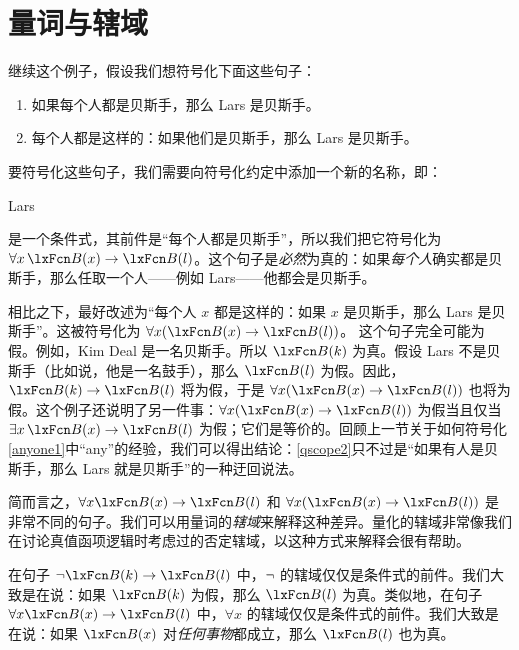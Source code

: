 \section{量词与辖域}
继续这个例子，假设我们想符号化下面这些句子：


\begin{enumerate}
		\item\label{qscope1} 如果每个人都是贝斯手，那么 Lars 是贝斯手。
		\item\label{qscope2} 每个人都是这样的：如果他们是贝斯手，那么 Lars 是贝斯手。
	\end{enumerate}


要符号化这些句子，我们需要向符号化约定中添加一个新的名称，即：


\begin{ekey}
		\item[l] Lars
	\end{ekey}


是一个条件式，其前件是“每个人都是贝斯手”，所以我们把它符号化为 $\forall x\, \atom{B}{x} \eif \atom{B}{l}$。这个句子是\emph{必然}为真的：如果\emph{每个人}确实都是贝斯手，那么任取一个人——例如 Lars——他都会是贝斯手。

相比之下，最好改述为“每个人 $x$ 都是这样的：如果 $x$ 是贝斯手，那么 Lars 是贝斯手”。这被符号化为 $\forall x (\atom{B}{x} \eif \atom{B}{l})$。
这个句子完全可能为假。例如，Kim Deal 是一名贝斯手。所以 $\atom{B}{k}$ 为真。假设 Lars 不是贝斯手（比如说，他是一名鼓手），那么 $\atom{B}{l}$ 为假。因此，$\atom{B}{k} \eif \atom{B}{l}$ 将为假，于是 $\forall x
(\atom{B}{x} \eif \atom{B}{l})$ 也将为假。这个例子还说明了另一件事：$\forall x (\atom{B}{x} \eif \atom{B}{l})$ 为假当且仅当 $\exists x\,\atom{B}{x} \eif \atom{B}{l}$ 为假；它们是等价的。回顾上一节关于如何符号化\cref{anyone1}中“any”的经验，我们可以得出结论：\cref*{qscope2}只不过是“如果有人是贝斯手，那么 Lars 就是贝斯手”的一种迂回说法。

简而言之，$\forall x \atom{B}{x} \eif \atom{B}{l}$ 和 $\forall x (\atom{B}{x} \eif \atom{B}{l})$ 是非常不同的句子。我们可以用量词的\emph{辖域}来解释这种差异。量化的辖域非常像我们在讨论真值函项逻辑时考虑过的否定辖域，以这种方式来解释会很有帮助。

在句子 $\enot \atom{B}{k} \eif \atom{B}{l}$ 中，$\neg$ 的辖域仅仅是条件式的前件。我们大致是在说：如果 $\atom{B}{k}$ 为假，那么 $\atom{B}{l}$ 为真。类似地，在句子 $\forall x \atom{B}{x} \eif \atom{B}{l}$ 中，$\forall x$ 的辖域仅仅是条件式的前件。我们大致是在说：如果 $\atom{B}{x}$ 对\emph{任何事物}都成立，那么 $\atom{B}{l}$ 也为真。

